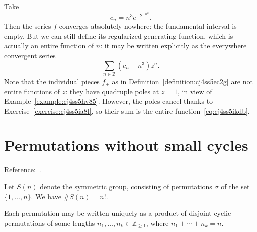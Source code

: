 \documentclass[reqno]{amsart} 
\begin{document}
\begin{example}
  Take
  \begin{equation*}
    c_n = n^3 e^{- 2^{- n^2 }}.
  \end{equation*}
  Then the series $f$ converges absolutely nowhere: the fundamental interval is empty.  But we can still define its regularized generating function, which is actually an entire function of $n$: it may be written explicitly as the everywhere convergent series
  \begin{equation}\label{eq:cj4ss5ikdb}
\sum_{n \in \mathbb{Z} } (c_n - n^3) z^n.
\end{equation}
Note that the individual pieces $f_{\pm}$ as in Definition~\ref{definition:cj4ss5ec2g} are not entire functions of $z$: they have quadruple poles at $z=1$, in view of Example~\ref{example:cj4ss5hv85}.  However, the poles cancel thanks to Exercise~\ref{exercise:cj4ss5ia8l}, so their sum is the entire function~\eqref{eq:cj4ss5ikdb}.
\end{example}


\section{Permutations without small cycles}\label{sec:cj4unj04kx}
Reference:~\cite[p176]{MR2172781}.

Let $S(n)$ denote the symmetric group, consisting of permutations $\sigma$ of the set $ \{1, \dotsc, n\}$.  We have $\# S(n) = n!$.

Each permutation may be written uniquely as a product of disjoint cyclic permutations of some lengths $n_1, \dotsc, n_k \in \mathbb{Z}_{\geq 1}$, where $n_1 + \dotsb + n_k = n$.
\end{document}
